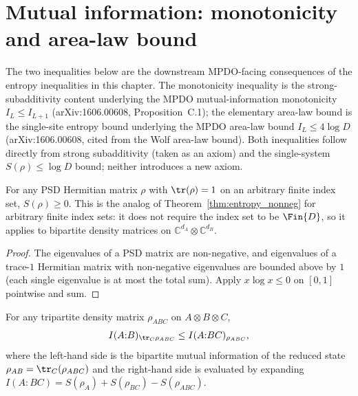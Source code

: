 \section{Mutual information: monotonicity and area-law bound}

The two inequalities below are the downstream MPDO-facing consequences
of the entropy inequalities in this chapter. The monotonicity inequality
is the strong-subadditivity content underlying the MPDO mutual-information
monotonicity $I_L \le I_{L+1}$
(arXiv:1606.00608, Proposition~C.1); the elementary area-law bound is
the single-site entropy bound underlying the MPDO area-law bound
$I_L \le 4\log D$ (arXiv:1606.00608, cited from the Wolf area-law
bound). Both inequalities follow directly from strong subadditivity
(taken as an axiom) and the single-system $S(\rho) \le \log D$ bound; neither
introduces a new axiom.

\begin{theorem}
    \label{thm:entropy_nonneg_finite_index}
    \leanok
    For any PSD Hermitian matrix $\rho$ with $\tr(\rho) = 1$ on an
    arbitrary finite index set, $S(\rho) \ge 0$. This is the
    analog of Theorem~\ref{thm:entropy_nonneg} for arbitrary finite
    index sets: it does
    not require the index set to be $\Fin{D}$, so it applies to
    bipartite density matrices on
    $\mathbb{C}^{d_A} \otimes \mathbb{C}^{d_B}$.
\end{theorem}

\begin{proof}\leanok
    The eigenvalues of a PSD matrix are non-negative, and eigenvalues
    of a trace-$1$ Hermitian matrix with non-negative eigenvalues are
    bounded above by $1$ (each single eigenvalue is at most the total
    sum). Apply $x\log x \le 0$ on $[0, 1]$ pointwise and sum.
\end{proof}

\begin{theorem}
    \label{thm:mutual_information_monotone_tripartite}
    \leanok
    For any tripartite density matrix $\rho_{ABC}$ on
    $A \otimes B \otimes C$,
    \[
        I(A{:}B)_{\tr_C \rho_{ABC}} \le  I(A{:}BC)_{\rho_{ABC}},
    \]
    where the left-hand side is the bipartite mutual information of
    the reduced state $\rho_{AB} = \tr_C(\rho_{ABC})$ and the
    right-hand side is evaluated by expanding
    $I(A{:}BC) = S(\rho_A) + S(\rho_{BC}) - S(\rho_{ABC})$.
\end{theorem}

